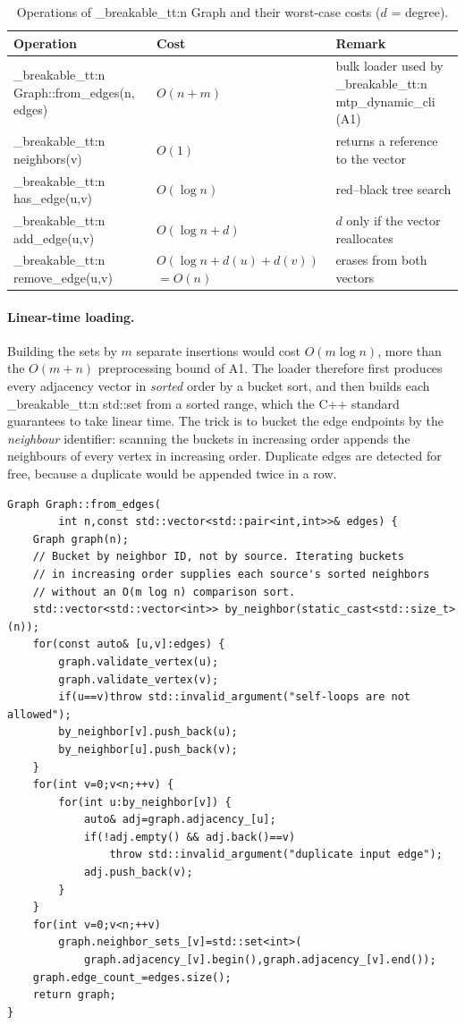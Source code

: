 \documentclass[11pt,a4paper,oneside]{report}
\theoremstyle{plain}
\theoremstyle{definition}
\theoremstyle{remark}
\DeclareRobustCommand{\code}[1]{\mtp_breakable_tt:n {#1}}
\DeclareRobustCommand{\file}[1]{\mtp_breakable_tt:n {#1}}
\begin{document}
\begin{table}[ht]
\centering\small
\caption[Operations of the Graph class]{Operations of \code{Graph} and their worst-case costs
(\(d\) = degree).}\label{tab:graph-ops}
\begin{tabularx}{\textwidth}{@{}llX@{}}
\toprule
\textbf{Operation} & \textbf{Cost} & \textbf{Remark}\\
\midrule
\code{Graph::from_edges(n, edges)} & \(O(n+m)\) & bulk loader used by \code{mtp_dynamic_cli} (A1)\\
\code{neighbors(v)} & \(O(1)\) & returns a reference to the vector\\
\code{has_edge(u,v)} & \(O(\log n)\) & red--black tree search\\
\code{add_edge(u,v)} & \(O(\log n + d)\) & \(d\) only if the vector reallocates\\
\code{remove_edge(u,v)} & \(O(\log n + d(u)+d(v))\) \(=O(n)\) & erases from both vectors\\
\bottomrule
\end{tabularx}
\end{table}

\paragraph{Linear-time loading.} Building the sets by \(m\) separate insertions would cost
\(O(m\log n)\), more than the \(O(m+n)\) preprocessing bound of A1. The loader therefore first
produces every adjacency vector in \emph{sorted} order by a bucket sort, and then builds each
\code{std::set} from a sorted range, which the C++ standard guarantees to take linear time.
The trick is to bucket the edge endpoints by the \emph{neighbour} identifier: scanning the
buckets in increasing order appends the neighbours of every vertex in increasing order.
Duplicate edges are detected for free, because a duplicate would be appended twice in a row.

\begin{lstlisting}[style=cpp,firstnumber=8,caption={\file{src/graph.cpp}, lines 8--35: the linear-time bulk loader \code{Graph::from_edges}.},label={lst:from-edges}]
Graph Graph::from_edges(
        int n,const std::vector<std::pair<int,int>>& edges) {
    Graph graph(n);
    // Bucket by neighbor ID, not by source. Iterating buckets
    // in increasing order supplies each source's sorted neighbors
    // without an O(m log n) comparison sort.
    std::vector<std::vector<int>> by_neighbor(static_cast<std::size_t>(n));
    for(const auto& [u,v]:edges) {
        graph.validate_vertex(u);
        graph.validate_vertex(v);
        if(u==v)throw std::invalid_argument("self-loops are not allowed");
        by_neighbor[v].push_back(u);
        by_neighbor[u].push_back(v);
    }
    for(int v=0;v<n;++v) {
        for(int u:by_neighbor[v]) {
            auto& adj=graph.adjacency_[u];
            if(!adj.empty() && adj.back()==v)
                throw std::invalid_argument("duplicate input edge");
            adj.push_back(v);
        }
    }
    for(int v=0;v<n;++v)
        graph.neighbor_sets_[v]=std::set<int>(
            graph.adjacency_[v].begin(),graph.adjacency_[v].end());
    graph.edge_count_=edges.size();
    return graph;
}
\end{lstlisting}
\end{document}

